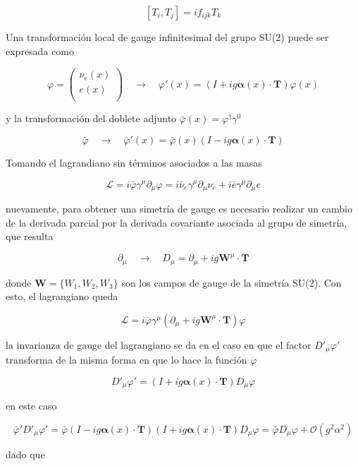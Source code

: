 $$ [T_i, T_j] = if_{ijk}T_k $$

Una transformación local de gauge infinitesimal del grupo SU(2) puede ser expresada como

$$ \varphi = \begin{pmatrix}
    \nu_e(x) \\
    e(x)\\
\end{pmatrix} \quad \longrightarrow \quad \varphi'(x) = (I + ig\boldsymbol\alpha (x) \cdot \textbf{T})\varphi(x) $$

y la transformación del doblete adjunto $\bar{\varphi}(x) = \varphi^{\dagger}\gamma^0$

$$ \bar{\varphi} \quad \longrightarrow \quad \bar{\varphi}'(x) = \bar{\varphi}(x)(I - ig\boldsymbol\alpha (x) \cdot \textbf{T}) $$

Tomando el lagrandiano sin términos asociados a las masas

$$ \mathcal{L} = i\bar{\varphi}\gamma^{\mu}\partial_{\mu}\varphi = i\bar{\nu}_e\gamma^{\mu}\partial_{\mu}\nu_e + i\bar{e}\gamma^{\mu}\partial_{\mu}e$$

nuevamente, para obtener una simetría de gauge es necesario realizar un cambio de la derivada parcial por la derivada covariante asociada al grupo de simetría, que resulta

$$ \partial_{\mu} \quad \longrightarrow \quad D_{\mu} = \partial_{\mu} + ig\textbf{W}^{\mu}\cdot \textbf{T} $$

donde $\textbf{W} = \{W_1,W_2,W_3\}$ son los campos de gauge de la simetría SU(2). Con esto, el lagrangiano queda

$$ \mathcal{L} = i\bar{\varphi}\gamma^{\mu}(\partial_{\mu} + ig\textbf{W}^{\mu}\cdot \textbf{T})\varphi $$

la invarianza de gauge del lagrangiano se da en el caso en que el factor $D'_{\mu}\varphi'$ transforma de la misma forma en que lo hace la función $\varphi$

\begin{equation}
    D'_{\mu}\varphi' = (I + ig\boldsymbol\alpha (x) \cdot \textbf{T})D_{\mu}\varphi
    \label{tr}
\end{equation}

en este caso

$$ \bar{\varphi}' D'_{\mu}\varphi' =\bar{\varphi} (I - ig\boldsymbol\alpha (x) \cdot \textbf{T})(I + ig\boldsymbol\alpha (x) \cdot \textbf{T})D_{\mu}\varphi = \bar{\varphi} D_{\mu}\varphi + \mathcal{O}(g^2\alpha^2) $$

dado que


